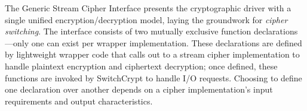 The Generic Stream Cipher Interface presents the cryptographic driver with a
single unified encryption/decryption model, laying the groundwork for
\emph{cipher switching}. The interface consists of two mutually exclusive
function declarations---only one can exist per wrapper implementation. These
declarations are defined by lightweight wrapper code that  calls
out to a stream cipher implementation to handle plaintext encryption and
ciphertext decryption; once defined, these functions are invoked by SwitchCrypt
to handle I/O requests. Choosing to define one declaration over another depends
on a cipher implementation's input requirements and output characteristics.


